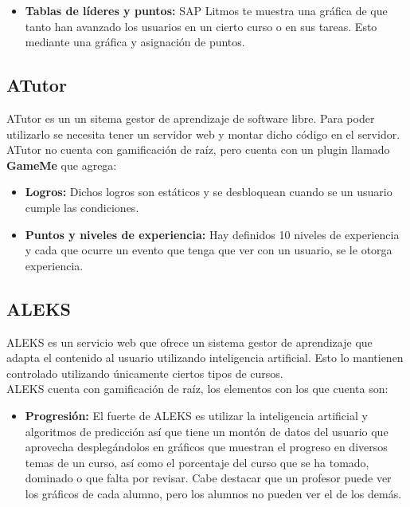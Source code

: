 \begin{multicols*}{2}
\begin{itemize}
        \item {\bf Tablas de líderes y puntos: } SAP Litmos te muestra una
         gráfica de que tanto han avanzado los usuarios en un cierto curso
         o en sus tareas. Esto mediante una gráfica y asignación de puntos.
         
    \end{itemize}


\subsection*{ATutor}

 ATutor es un un sitema gestor de aprendizaje de software libre. Para poder
 utilizarlo se necesita tener un servidor web y montar dicho código en el servidor.\\
    
    \noindent ATutor no cuenta con gamificación de raíz,
    pero cuenta con un plugin llamado \textbf{GameMe} que agrega:
    
    \begin{itemize}
        \item {\bf Logros:} Dichos logros son estáticos y se
        desbloquean cuando se un usuario cumple las condiciones.
        
        \item {\bf Puntos y niveles de experiencia:} Hay definidos 10
        niveles de experiencia y cada que ocurre un evento que tenga
        que ver con un usuario, se le otorga experiencia.
        
    \end{itemize}



\subsection*{ALEKS}

 ALEKS es un servicio web que ofrece un sistema gestor de aprendizaje
 que adapta el contenido al usuario utilizando inteligencia artificial.
 Esto lo mantienen controlado utilizando únicamente ciertos tipos de cursos.\\
    
    \noindent ALEKS cuenta con gamificación de raíz, los elementos con los que cuenta son:
    
    \begin{itemize}
        \item {\bf Progresión:} El fuerte de ALEKS es utilizar la inteligencia
        artificial y algoritmos de predicción así que tiene un montón de datos del
        usuario que aprovecha desplegándolos en gráficos que muestran el progreso
        en diversos temas de un curso, así como el porcentaje del curso que se ha
        tomado, dominado o que falta por revisar. Cabe destacar que un profesor puede
        ver los gráficos de cada alumno, pero los alumnos no pueden ver el de los demás.
        

\end{itemize}
\end{multicols*}
